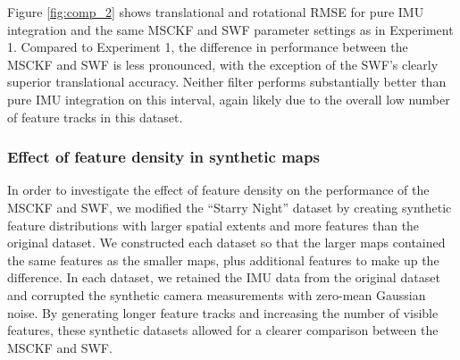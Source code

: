 \documentclass[letterpaper, 10 pt, conference]{ieeeconf}  %
\begin{document}
Figure \ref{fig:comp_2} shows translational and rotational RMSE for pure IMU integration and the same MSCKF and SWF parameter settings as in Experiment 1.
Compared to Experiment 1, the difference in performance between the MSCKF and SWF is less pronounced, with the exception of the SWF's clearly superior translational accuracy.
Neither filter performs substantially better than pure IMU integration on this interval, again likely due to the overall low number of feature tracks in this dataset.




\subsubsection{Effect of feature density in synthetic maps}
In order to investigate the effect of feature density on the performance of the MSCKF and SWF, we modified the ``Starry Night'' dataset by creating synthetic feature distributions with larger spatial extents and more features than the original dataset.
We constructed each dataset so that the larger maps contained the same features as the smaller maps, plus additional features to make up the difference.
In each dataset, we retained the IMU data from the original dataset and corrupted the synthetic camera measurements with zero-mean Gaussian noise.
By generating longer feature tracks and increasing the number of visible features, these synthetic datasets allowed for a clearer comparison between the MSCKF and SWF.

\end{document}
